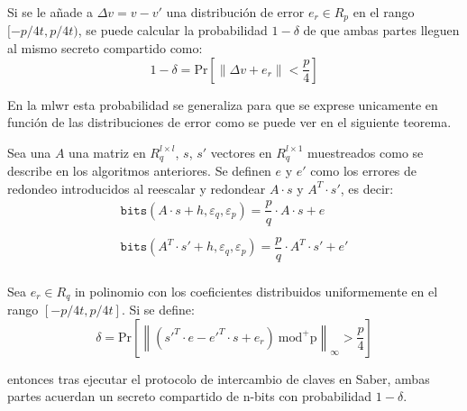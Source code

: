 Si se le añade a $\Delta v = v-v'$ una distribución de error \(e_r \in R_p\) en el rango \([-p/4t,p/4t)\), se puede calcular la probabilidad \(1-\delta\) de que ambas partes lleguen al mismo secreto compartido como:
\begin{equation}
	\label{eq:Frodo}
	1-\delta= \text{Pr}\left[\|\Delta v + e_r\|< \dfrac{p}{4}\right]
\end{equation}

En la \acrshort{mlwr} esta probabilidad se generaliza para que se exprese unicamente en función de las distribuciones de error como se puede ver en el siguiente teorema.

\begin{theorem}
 Sea una \(A\) una matriz en \(R_q^{l\times l}\), \(s\), \(s'\) vectores en \(R_q^{l\times 1}\) muestreados como se describe en los algoritmos anteriores. Se definen \(e\) y \(e'\) como los errores de redondeo introducidos al reescalar y redondear \(A\cdot s\) y \(A^T\cdot s'\), es decir:
 \begin{equation}
 	\label{eq:bitsec}
 	\begin{array}{l}
 		\texttt{bits}(A\cdot s+h,\varepsilon_q,\varepsilon_p)=\dfrac{p}{q}\cdot A\cdot
 		s +e\\\\
 		\texttt{bits}(A^T\cdot s'+h,\varepsilon_q,\varepsilon_p)=\dfrac{p}{q}\cdot A^T\cdot
 		s' +e'\\
 	\end{array}
 \end{equation}
 
 Sea \(e_r  \in R_q\) in polinomio con los coeficientes distribuidos uniformemente en el rango \([-p/4t,p/4t]\). Si se define:
 \begin{equation}
 	\label{eq:probrefeSab}
 	\delta = \text{Pr}\left[\left\|\left(s'^T\cdot e-e'^T\cdot s+ e_r\right) \ \text{mod}^{+}\text{p}  \right\|_\infty > \dfrac{p}{4}\right]
 \end{equation}
 
 entonces tras ejecutar el protocolo de intercambio de claves en Saber, ambas partes acuerdan un secreto compartido de n-bits con probabilidad \(1-\delta\).
\end{theorem} 
